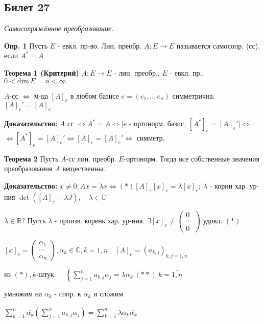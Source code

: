 \subsection{Билет 27}

\textit{Самосопряжённое преобразование.}

\textbf{Опр. 1} Пусть $E $ - евкл. пр-во. Лин. преобр. $A : E \to E$ называется самосопр. (сс), если $A^* = A$

\textbf{Теорема 1 (Критерий)} $A : E \to E$ - лин. преобр., $E$ - евкл. пр., $0 < \mathrm{dim}\,E = n < \infty$

$A$-сс $\Leftrightarrow$ м-ца $[A]_e$ в любом базисе $e=(e_1,..,e_n)$ симметрична: $[A]_e' = [A]_e$

\textbf{Доказательство:} $A$ сс $\Leftrightarrow A^* = A \Leftrightarrow [ e$ - ортонорм. базис, $[A^*]_e = [A]_e' ] \Leftrightarrow$\\$ \Leftrightarrow [A^*]_e = [A]_e' \Leftrightarrow [A]_e = [A]_e' \Leftrightarrow $ симметр.

\textbf{Теорема 2} Пусть $A$-сс лин. преобр. $E$-ортонорм. Тогда все собственные значения преобразования $A$ вещественны.

\textbf{Доказательство:} $x \ne 0; Ax = \lambda x \Leftrightarrow (*) [A]_e [x]_e = \lambda[x]_e;\ \lambda$ - корни хар. ур-ния $\det\left( [A]_e - \lambda J \right),\quad \lambda \in \mathbb{C}$

$\lambda \in \mathbb{R} ? $ Пусть $\lambda$ - произв. корень хар. ур-ния. $\exists [x]_e \ne \begin{pmatrix} 0 \\ \cdots \\ 0\end{pmatrix}$ удовл. $(*)$

$[x]_e = \begin{pmatrix} \alpha_1 \\ \cdots \\ \alpha_n \end{pmatrix}, \alpha_k \in \mathbb{C}, k = \overline{1,n}\quad [A]_e = (a_{k,j})_{k,j = \overline{1,n}}$

из $(*), k$-штук: $\quad  \left\{ \sum\limits_{j=1}^n a_{k,j} \alpha_j \right. = \lambda \alpha_k\ (**)\ k = \overline{1,n}$

умножим на $\overline{\alpha_k}$ - сопр. к $\alpha_k$ и сложим

$\sum\limits_{k=1}^n \overline{\alpha_k} \left( \sum\limits_{j=1}^n a_{k,j} \alpha_j \right) = \sum\limits_{k=1}^n \lambda \alpha_k \overline{\alpha_k}$

